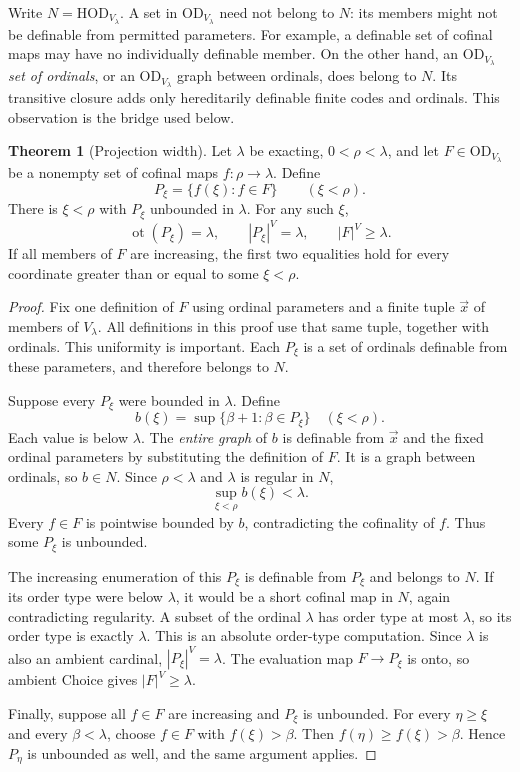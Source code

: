 \documentclass[11pt,letterpaper]{article}
\theoremstyle{definition}
\newtheorem{theorem}[definition]{Theorem}
\newcommand{\HOD}{\mathrm{HOD}}
\newcommand{\OD}{\mathrm{OD}}
\newcommand{\ot}{\operatorname{ot}}
\begin{document}
Write $N=\HOD_{V_\lambda}$. A set in $\OD_{V_\lambda}$ need not belong
to $N$: its members might not be definable from permitted parameters.
For example, a definable set of cofinal maps may have no individually
definable member. On the other hand, an $\OD_{V_\lambda}$ \emph{set of
ordinals}, or an $\OD_{V_\lambda}$ graph between ordinals, does belong
to $N$. Its transitive closure adds only hereditarily definable finite
codes and ordinals. This observation is the bridge used below.

\begin{theorem}[Projection width]\label{thm:width}
Let $\lambda$ be exacting, $0<\rho<\lambda$, and let
$F\in\OD_{V_\lambda}$ be a nonempty set of cofinal maps
$f:\rho\to\lambda$. Define
\[
 P_\xi=\{f(\xi):f\in F\}\qquad(\xi<\rho).
\]
There is $\xi<\rho$ with $P_\xi$ unbounded in $\lambda$. For any such
$\xi$,
\begin{equation}\label{eq:fullwidth}
 \ot(P_\xi)=\lambda,\qquad |P_\xi|^V=\lambda,
 \qquad |F|^V\geq\lambda.
\end{equation}
If all members of $F$ are increasing, the first two equalities hold for
every coordinate greater than or equal to some $\xi<\rho$.
\end{theorem}

\begin{proof}
Fix one definition of $F$ using ordinal parameters and a finite tuple
$\vec x$ of members of $V_\lambda$. All definitions in this proof use
that same tuple, together with ordinals. This uniformity is important.
Each $P_\xi$ is a set of ordinals definable from these parameters, and
therefore belongs to $N$.

Suppose every $P_\xi$ were bounded in $\lambda$. Define
\[
 b(\xi)=\sup\{\beta+1:\beta\in P_\xi\}\quad(\xi<\rho).
\]
Each value is below $\lambda$. The \emph{entire graph} of $b$ is
definable from $\vec x$ and the fixed ordinal parameters by substituting
the definition of $F$. It is a graph between ordinals, so $b\in N$.
Since $\rho<\lambda$ and $\lambda$ is regular in $N$,
\[
 \sup_{\xi<\rho}b(\xi)<\lambda.
\]
Every $f\in F$ is pointwise bounded by $b$, contradicting the cofinality
of $f$. Thus some $P_\xi$ is unbounded.

The increasing enumeration of this $P_\xi$ is definable from $P_\xi$
and belongs to $N$. If its order type were below $\lambda$, it would
be a short cofinal map in $N$, again contradicting regularity. A subset
of the ordinal $\lambda$ has order type at most $\lambda$, so its order
type is exactly $\lambda$. This is an absolute order-type computation.
Since $\lambda$ is also an ambient cardinal, $|P_\xi|^V=\lambda$.
The evaluation map $F\to P_\xi$ is onto, so ambient Choice gives
$|F|^V\geq\lambda$.

Finally, suppose all $f\in F$ are increasing and $P_\xi$ is unbounded.
For every $\eta\geq\xi$ and every $\beta<\lambda$, choose $f\in F$
with $f(\xi)>\beta$. Then $f(\eta)\geq f(\xi)>\beta$. Hence
$P_\eta$ is unbounded as well, and the same argument applies.
\end{proof}
\end{document}
